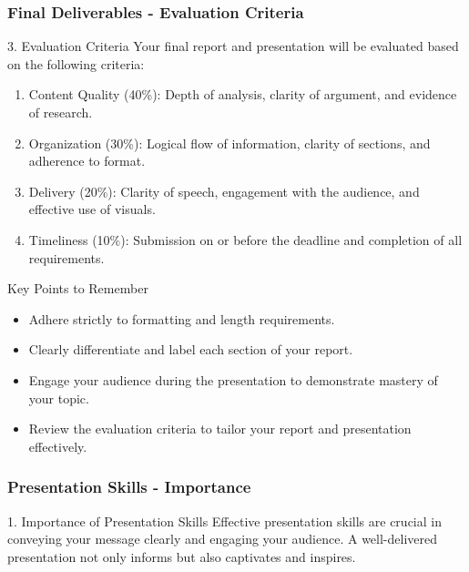 \documentclass{beamer}
\begin{document}
\begin{frame}[fragile]
    \frametitle{Final Deliverables - Evaluation Criteria}
    \begin{block}{3. Evaluation Criteria}
        Your final report and presentation will be evaluated based on the following criteria:
        \begin{enumerate}
            \item Content Quality (40\%): Depth of analysis, clarity of argument, and evidence of research.
            \item Organization (30\%): Logical flow of information, clarity of sections, and adherence to format.
            \item Delivery (20\%): Clarity of speech, engagement with the audience, and effective use of visuals.
            \item Timeliness (10\%): Submission on or before the deadline and completion of all requirements.
        \end{enumerate}
    \end{block}

    \begin{block}{Key Points to Remember}
        \begin{itemize}
            \item Adhere strictly to formatting and length requirements.
            \item Clearly differentiate and label each section of your report.
            \item Engage your audience during the presentation to demonstrate mastery of your topic.
            \item Review the evaluation criteria to tailor your report and presentation effectively.
        \end{itemize}
    \end{block}
\end{frame}

\begin{frame}[fragile]
    \frametitle{Presentation Skills - Importance}
    \begin{block}{1. Importance of Presentation Skills}
        Effective presentation skills are crucial in conveying your message clearly and engaging your audience. A well-delivered presentation not only informs but also captivates and inspires.
    \end{block}
\end{frame}
\end{document}
